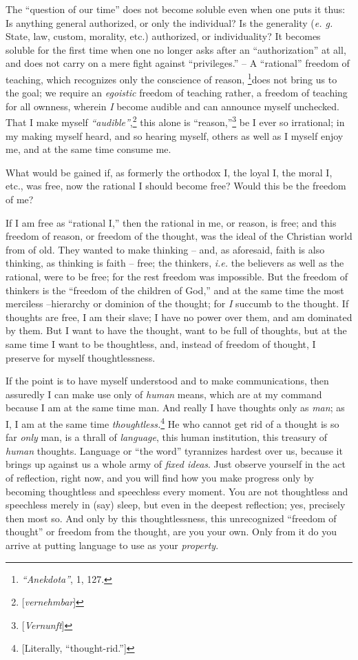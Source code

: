 \documentclass[12pt,a4paper]{book}
\begin{document}
The ``question of our time'' does not become soluble even when one puts it 
thus: Is anything general authorized, or only the individual? Is the 
generality (\textit{e. g.} State, law, custom, morality, etc.) authorized, or 
individuality? It becomes soluble for the first time when one no longer asks 
after an ``authorization'' at all, and does not carry on a mere fight 
against ``privileges.'' -- A ``rational'' freedom of teaching, which 
recognizes only the conscience of reason, \footnote{\textit{``Anekdota''}, 
1, 127. }does not bring us to the goal; we require an \textit{egoistic} 
freedom of teaching rather, a freedom of teaching for all ownness, wherein 
\textit{I} become audible and can announce myself unchecked. That I make 
myself \textit{``audible''},\footnote{[\textit{vernehmbar}]} this alone is 
``reason,''\footnote{[\textit{Vernunft}]} be I ever so irrational; in my 
making myself heard, and so hearing myself, others as well as I myself enjoy 
me, and at the same time consume me.

What would be gained if, as formerly the orthodox I, the loyal I, the moral I, 
etc., was free, now the rational I should become free? Would this be the 
freedom of me?

If I am free as ``rational I,'' then the rational in me, or reason, is free; 
and this freedom of reason, or freedom of the thought, was the ideal of the 
Christian world from of old. They wanted to make thinking -- and, as 
aforesaid, faith is also thinking, as thinking is faith -- free; the thinkers, 
\textit{i.e.} the believers as well as the rational, were to be free; for the 
rest freedom was impossible. But the freedom of thinkers is the ``freedom of 
the children of God,'' and at the same time the most merciless --hierarchy or 
dominion of the thought; for \textit{I} succumb to the thought. If thoughts 
are free, I am their slave; I have no power over them, and am dominated by 
them. But I want to have the thought, want to be full of thoughts, but at the 
same time I want to be thoughtless, and, instead of freedom of thought, I 
preserve for myself thoughtlessness.

If the point is to have myself understood and to make communications, then 
assuredly I can make use only of \textit{human} means, which are at my command 
because I am at the same time man. And really I have thoughts only as 
\textit{man}; as I, I am at the same time 
\textit{thoughtless.}\footnote{[Literally, ``thought-rid.'']} He who cannot 
get rid of a thought is so far \textit{only} man, is a thrall of 
\textit{language}, this human institution, this treasury of \textit{human} 
thoughts. Language or ``the word'' tyrannizes hardest over us, because it 
brings up against us a whole army of \textit{fixed ideas}. Just observe 
yourself in the act of reflection, right now, and you will find how you make 
progress only by becoming thoughtless and speechless every moment. You are not 
thoughtless and speechless merely in (say) sleep, but even in the deepest 
reflection; yes, precisely then most so. And only by this thoughtlessness, 
this unrecognized ``freedom of thought'' or freedom from the thought, are 
you your own. Only from it do you arrive at putting language to use as your 
\textit{property}.
\end{document}
